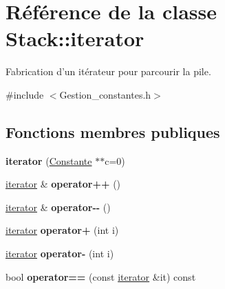 \hypertarget{class_stack_1_1iterator}{\section{Référence de la classe Stack\-:\-:iterator}
\label{class_stack_1_1iterator}
}


Fabrication d'un itérateur pour parcourir la pile.  




{\ttfamily \#include $<$Gestion\-\_\-constantes.\-h$>$}

\subsection*{Fonctions membres publiques}
\begin{DoxyCompactItemize}
\item 
\hypertarget{class_stack_1_1iterator_a4b9792711672ac97ec495af782860279}{{\bfseries iterator} (\hyperlink{class_calcul_1_1_constante}{Constante} $\ast$$\ast$c=0)}\label{class_stack_1_1iterator_a4b9792711672ac97ec495af782860279}

\item 
\hypertarget{class_stack_1_1iterator_a0a077f983ba21687eeda7b3788816cf1}{\hyperlink{class_stack_1_1iterator}{iterator} \& {\bfseries operator++} ()}\label{class_stack_1_1iterator_a0a077f983ba21687eeda7b3788816cf1}

\item 
\hypertarget{class_stack_1_1iterator_a2c52416481ccb91a5681d01d372abf9e}{\hyperlink{class_stack_1_1iterator}{iterator} \& {\bfseries operator-\/-\/} ()}\label{class_stack_1_1iterator_a2c52416481ccb91a5681d01d372abf9e}

\item 
\hypertarget{class_stack_1_1iterator_a16234d3b7b4fd5b49cd634e062a9240c}{\hyperlink{class_stack_1_1iterator}{iterator} {\bfseries operator+} (int i)}\label{class_stack_1_1iterator_a16234d3b7b4fd5b49cd634e062a9240c}

\item 
\hypertarget{class_stack_1_1iterator_ac329d5beacfe94923df7c0c092a3cfdc}{\hyperlink{class_stack_1_1iterator}{iterator} {\bfseries operator-\/} (int i)}\label{class_stack_1_1iterator_ac329d5beacfe94923df7c0c092a3cfdc}

\item 
\hypertarget{class_stack_1_1iterator_a820678f63d31ed6a39fcdff8bf75b92f}{bool {\bfseries operator==} (const \hyperlink{class_stack_1_1iterator}{iterator} \&it) const }\label{class_stack_1_1iterator_a820678f63d31ed6a39fcdff8bf75b92f}


\end{DoxyCompactItemize}
